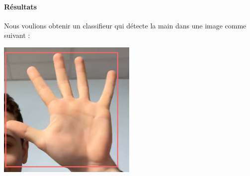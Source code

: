 \documentclass[11pt]{article}
\begin{document}
\paragraph{Résultats}
Nous voulions obtenir un classifieur qui détecte la main dans une image comme suivant : 
\begin{center}
    \includegraphics[width=0.5\textwidth]{images/res_attendu.png}
\end{center}
\end{document}
